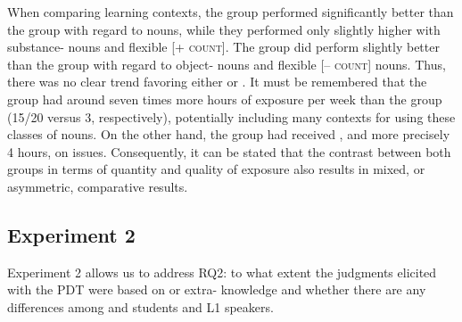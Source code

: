 \documentclass[output=paper]{langsci/langscibook}
\begin{document}
When comparing learning contexts, the  group performed significantly better than the  group with regard to  nouns, while they performed only slightly higher with substance- nouns and flexible [\textsc{+ count}]. The  group did perform slightly better than the  group with regard to object- nouns and flexible [\textsc{– count}] nouns.  Thus, there was no clear trend favoring either  or . It must be remembered that the  group had around seven times more hours of exposure per week than the  group (15/20 versus 3, respectively), potentially including many contexts for using these classes of nouns. On the other hand, the  group had received , and more precisely 4 hours, on  issues. Consequently, it can be stated that the contrast between both groups in terms of quantity and quality of exposure also results in mixed, or asymmetric, comparative results. 



\subsection{Experiment 2}


 Experiment 2 allows us to address RQ2: to what extent the judgments elicited with the PDT were based on  or extra- knowledge and whether there are any differences among  and  students and L1  speakers.  
\end{document}
